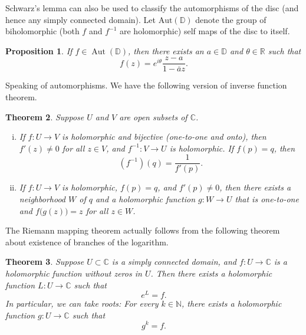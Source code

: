 \documentclass[12pt,openany]{book}
\newcommand{\C}{{\mathbb{C}}}
\newcommand{\R}{{\mathbb{R}}}
\newcommand{\N}{{\mathbb{N}}}
\newcommand{\D}{{\mathbb{D}}}
\theoremstyle{plain}
\newtheorem{thm}{Theorem}[section]
\newtheorem{prop}[thm]{Proposition}
\theoremstyle{remark}
\theoremstyle{definition}
\theoremstyle{exercise}
\theoremstyle{example}
\begin{document}
Schwarz's lemma can also be used to classify the automorphisms of the disc
(and hence any simply connected domain).  Let
$\operatorname{Aut(\D)}$ denote the group of biholomorphic (both $f$ and
$f^{-1}$ are holomorphic) self maps of the
disc to itself.

\begin{prop}
If $f \in \operatorname{Aut}(\D)$, then there exists an $a \in \D$
and $\theta \in \R$ such that
\begin{equation*}
f(z) = e^{i\theta} \frac{z-a}{1-\bar{a}z} .
\end{equation*}
\end{prop}

Speaking of automorphisms.  We have the following
version of inverse function theorem.

\begin{thm}
Suppose $U$ and $V$ are open subsets of $\C$.
\begin{enumerate}[(i)]
\item
If $f \colon U \to V$ is holomorphic and bijective (one-to-one and onto),
then $f'(z) \not= 0$ for all $z \in V$, and $f^{-1} \colon V \to U$
is holomorphic.  If $f(p) = q$, then
\begin{equation*}
\left(f^{-1}\right)(q) = \frac{1}{f'(p)} .
\end{equation*}
\item
If $f \colon U \to V$ is holomorphic, $f(p) = q$,
and $f'(p) \not= 0$, then there exists a neighborhood $W$ of $q$
and a holomorphic function $g \colon W \to U$ that is
one-to-one and $f\bigl(g(z)\bigr) = z$ for all $z \in W$.
\end{enumerate}
\end{thm}

\pagebreak[2]
The Riemann mapping theorem actually follows from the following
theorem about existence of branches of the logarithm.

\begin{thm}
Suppose $U \subset \C$ is a simply connected domain, and $f \colon U \to \C$
is a holomorphic function without zeros in $U$.  Then there exists a
holomorphic function $L \colon U \to \C$ such that
\begin{equation*}
e^L = f .
\end{equation*}
In particular, we can take roots:
For every $k \in \N$, there exists a holomorphic function
$g \colon U \to \C$ such that
\begin{equation*}
g^k = f .
\end{equation*}
\end{thm}
\end{document}
